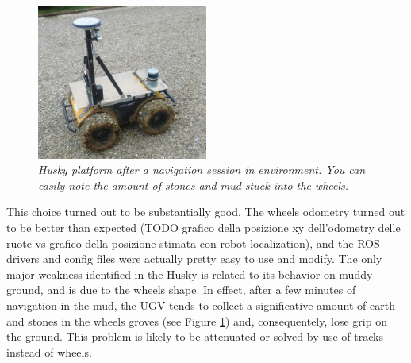 \begin{figure}
	\centering
	\includegraphics[width=0.5\textwidth]{Images/grape_sw_hw_architecture/ruoteFangose.jpeg}
	\caption{\textit{Husky platform after a navigation session in environment. You can easily note the amount of stones and mud stuck into the wheels.}}
	\label{fig:ruoteFangose}
\end{figure}

This choice turned out to be substantially good. The wheels odometry turned out to be  better than expected (TODO grafico della posizione xy dell'odometry delle ruote vs grafico della posizione stimata con robot localization), and the \ac{ROS} drivers and config files were actually pretty easy to use and modify. The only major weakness identified in the Husky is related to its behavior on muddy ground, and is due to the wheels shape. In effect, after a few minutes of navigation in the mud, the \ac{UGV} tends to collect a significative amount of earth and stones in the wheels groves (see Figure \ref{fig:ruoteFangose}) and, consequentely, lose grip on the ground. This problem is likely to be attenuated or solved by use of tracks instead of wheels.

